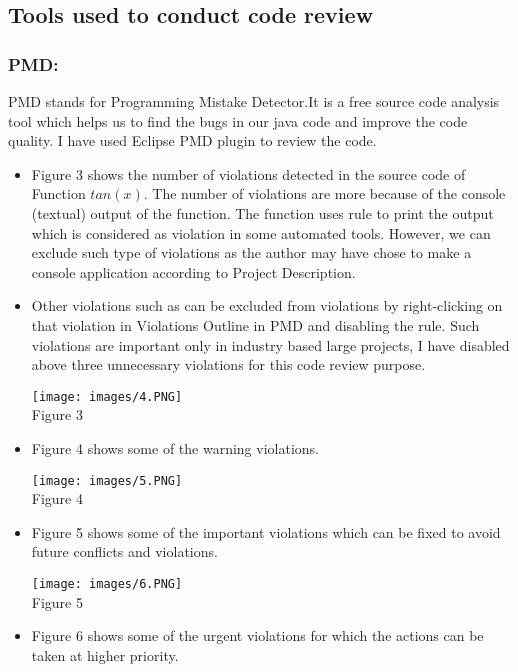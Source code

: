 \documentclass[10pt,letterpaper]{article}
\begin{document}
\subsection{Tools used to conduct code review}
\subsubsection{PMD:}
PMD stands for Programming Mistake Detector.It is a free source code analysis tool which helps us to find the bugs in our java code and improve the code quality. I have used Eclipse PMD plugin to review the code.
\begin{itemize}
    \item Figure 3 shows the number of violations detected in the source code of Function $tan(x)$. The number of violations are more because of the console (textual) output of the function. The function uses  rule to print the output which is considered as violation in some automated tools. However, we can exclude such type of violations as the author may have chose to make a console application according to Project Description. 
    \item Other violations such as  can be excluded from violations by right-clicking on that violation in Violations Outline in PMD and disabling the rule. Such violations are important only in industry based large projects, I have disabled above three unnecessary violations for this code review purpose.
\begin{center}
    \texttt{[image: images/4.PNG]}\\
    \caption{Figure 3}
\end{center} 
    \item Figure 4 shows some of the warning violations. 
    \begin{center}
    \texttt{[image: images/5.PNG]}\\
    \caption{Figure 4}
\end{center} 
\item Figure 5 shows some of the important violations which can be fixed to avoid future conflicts and violations.  
    \begin{center}
    \texttt{[image: images/6.PNG]}\\
    \caption{Figure 5}
\end{center}
\item Figure 6 shows some of the urgent violations for which the actions can be taken at higher priority.  

\end{itemize}
\end{document}
